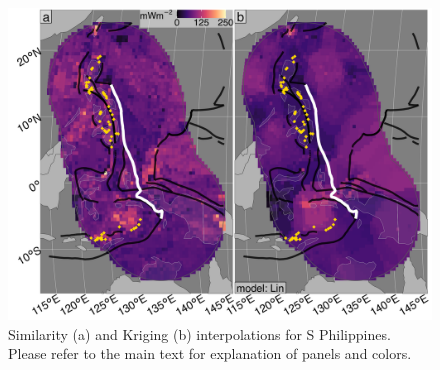 \begin{figure}[htbp]

{\centering \includegraphics[width=1\linewidth,]{assets/figs/chpt3/SPhilippinesDiffComp} 

}

\caption[Similarityand Kriging interpolations for S Philippines]{Similarity (a) and Kriging (b) interpolations for S Philippines. Please refer to the main text for explanation of panels and colors.}\label{fig:sPhilippinesDiff}
\end{figure}

